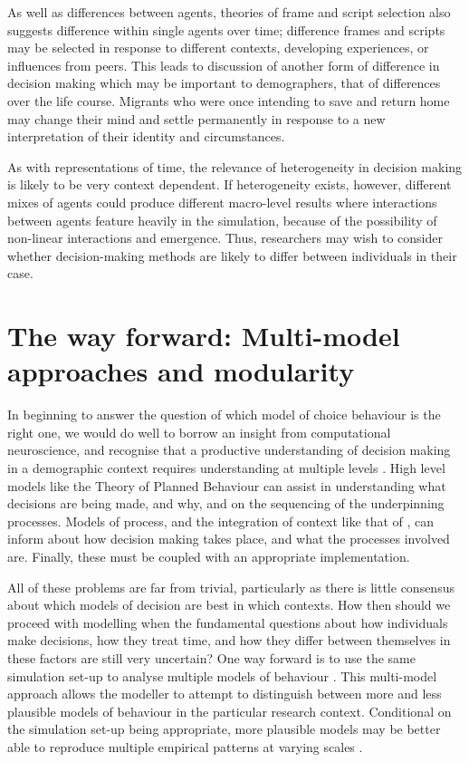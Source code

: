 \documentclass{article}
\begin{document}
As well as differences between agents, theories of frame and script selection also suggests difference within single agents over time; difference frames and scripts may be selected in response to different contexts, developing experiences, or influences from peers. This leads to discussion of another form of difference in decision making which may be important to demographers, that of differences over the life course. Migrants who were once intending to save and return home may change their mind and settle permanently in response to a new interpretation of their identity and circumstances.

As with representations of time, the relevance of heterogeneity in decision making is likely to be very context dependent. If heterogeneity exists, however, different mixes of agents could produce different macro-level results where interactions between agents feature heavily in the simulation, because of the possibility of non-linear interactions and emergence. Thus, researchers may wish to consider whether decision-making methods are likely to differ between individuals in their case.

\section{The way forward: Multi-model approaches and
modularity}\label{multi-model-approaches-and-modularity}

In beginning to answer the question of which model of choice behaviour is the right one, we would do well to borrow an insight from computational neuroscience, and recognise that a productive understanding of decision making in a demographic context requires understanding at multiple levels \citep{Marr1976,Marr1982}. High level models like the Theory of Planned Behaviour \citep{Ajzen1991} can assist in understanding what decisions are being made, and why, and on the sequencing of the underpinning processes. Models of process, and the integration of context like that of \citet{Ben-Akiva2012}, can inform about how decision making takes place, and what the processes involved are. Finally, these must be coupled with an appropriate implementation. 

All of these problems are far from trivial, particularly as there is little consensus about which models of decision are best in which contexts. How then should we proceed with modelling when the fundamental questions about how individuals make decisions, how they treat time, and how they differ between themselves in these factors are still very uncertain? One way forward is to use the same simulation set-up to analyse multiple models of behaviour \citep{Rossiter2014}. This multi-model approach allows the modeller to attempt to distinguish between more and less plausible models of behaviour in the particular research context. Conditional on the simulation set-up being appropriate, more plausible models may be better able to reproduce multiple empirical patterns at varying scales \citep{Werker2004, Bianchi2008}.
\end{document}
